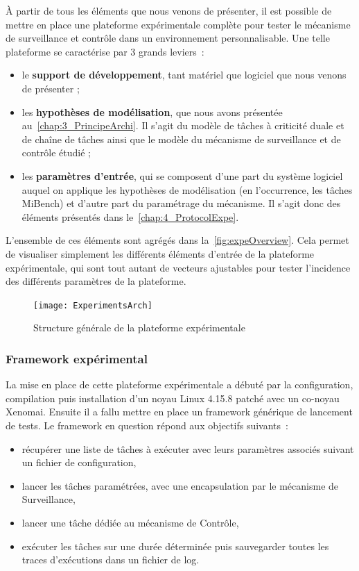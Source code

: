 \documentclass[french, a4paper, 11pt, twoside, pdftex]{StyleThese}
\begin{document}
    À partir de tous les éléments que nous venons de présenter, il est possible de mettre en place une plateforme expérimentale complète pour tester le mécanisme de surveillance et contrôle dans un environnement personnalisable. Une telle plateforme se caractérise par 3 grands leviers~: \begin{itemize}
    	\item le \textbf{support de développement}, tant matériel que logiciel que nous venons de présenter ;
    	\item les \textbf{hypothèses de modélisation}, que nous avons présentée au~\autoref{chap:3_PrincipeArchi}. Il s'agit du modèle de tâches à criticité duale et de chaîne de tâches ainsi que le modèle du mécanisme de surveillance et de contrôle étudié ;
    	\item les \textbf{paramètres d'entrée}, qui se composent d'une part du système logiciel auquel on applique les hypothèses de modélisation (en l’occurrence, les tâches MiBench) et d'autre part du paramétrage du mécanisme. Il s'agit donc des éléments présentés dans le~\autoref{chap:4_ProtocolExpe}.
    \end{itemize}
	L'ensemble de ces éléments sont agrégés dans la~\autoref{fig:expeOverview}. Cela permet de visualiser simplement les différents éléments d'entrée de la plateforme expérimentale, qui sont tout autant de vecteurs ajustables pour tester l'incidence des différents paramètres de la plateforme. 
	
	\begin{figure}[ht]
		\centering
		\texttt{[image: ExperimentsArch]}
		\caption{Structure générale de la plateforme expérimentale\label{fig:expeOverview}}
	\end{figure}

    	\subsubsection{Framework expérimental}
    
    La mise en place de cette plateforme expérimentale a débuté par la configuration, compilation puis installation d'un noyau Linux 4.15.8 patché avec un co-noyau Xenomai. Ensuite il a fallu mettre en place un framework générique de lancement de tests. Le framework en question répond aux objectifs suivants~:
    \begin{itemize}
    	\item récupérer une liste de tâches à exécuter avec leurs paramètres associés suivant un fichier de configuration,
    	\item lancer les tâches paramétrées, avec une encapsulation par le mécanisme de Surveillance,
    	\item lancer une tâche dédiée au mécanisme de Contrôle,
    	\item exécuter les tâches sur une durée déterminée puis sauvegarder toutes les traces d'exécutions dans un fichier de log.
    \end{itemize}
\end{document}
